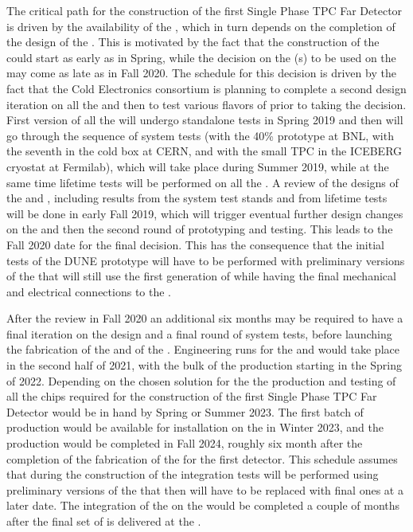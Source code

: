 The critical path for the construction of the first Single Phase
TPC Far Detector is driven by the availability of the ,
which in turn depends on the completion of the design of the
. This is motivated by the fact that the construction
of the  could start as early as in Spring, while the
decision on the (s) to be used on the 
may come as late as in Fall 2020. The schedule for this decision
is driven by the fact that the Cold Electronics consortium is
planning to complete a second design iteration on all the 
and then to test various flavors of  prior to taking
the decision. First version of all the  will undergo
standalone tests in Spring 2019 and then will go through the 
sequence of system tests (with the 40\%  prototype at BNL,
with the seventh   in the cold box at CERN,
and with the small TPC in the ICEBERG cryostat at Fermilab), which
will take place during Summer 2019, while at the same time lifetime
tests will be performed on all the . A review of the 
designs of the  and , including results
from the system test stands and from lifetime tests will be done
in early Fall 2019, which will trigger eventual further design
changes on the  and then the second round of prototyping
and testing. This leads to the Fall 2020 date for the final
 decision. This has the consequence that the initial
tests of the DUNE prototype  will have to be performed
with preliminary versions of the  that will still use
the first generation of  while having the final 
mechanical and electrical connections to the .

After the review in Fall 2020 an additional six months may be 
required to have a final iteration on the  design
and a final round of system tests, before launching the fabrication
of the  and of the . Engineering runs
for the  and  would take place in the
second half of 2021, with the bulk of the production starting in
the Spring of 2022. Depending on the chosen solution for the
 the production and testing of all the chips required
for the construction of the first Single Phase TPC Far Detector
would be in hand by Spring or Summer 2023. The first batch of
production  would be available for installation on
the  in Winter 2023, and the production would be
completed in Fall 2024, roughly six month after the completion
of the fabrication of the  for the first detector.
This schedule assumes that during the construction of the 
 integration tests will be performed using preliminary
versions of the  that then will have to be replaced
with final ones at a later date. The integration of the 
on the  would be completed a couple of months after
the final set of  is delivered at the .

